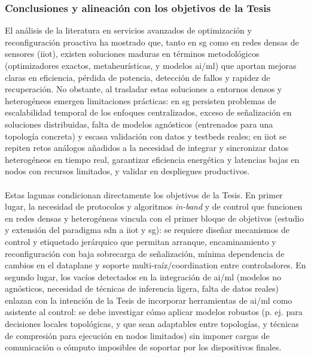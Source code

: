 \subsubsection{Conclusiones y alineación con los objetivos de la Tesis}
\label{subsubsec:conclu_opt}
El análisis de la literatura en servicios avanzados de optimización y reconfiguración proactiva ha mostrado que, tanto en \gls{sg} como en redes densas de sensores (\gls{iiot}), existen soluciones maduras en términos metodológicos (optimizadores exactos, metaheurísticas, y modelos \gls{ai}/\gls{ml}) que aportan mejoras claras en eficiencia, pérdida de potencia, detección de fallos y rapidez de recuperación. No obstante, al trasladar estas soluciones a entornos densos y heterogéneos emergen limitaciones prácticas: en \gls{sg} persisten problemas de escalabilidad temporal de los enfoques centralizados, exceso de señalización en soluciones distribuidas, falta de modelos agnósticos (entrenados para una topología concreta) y escasa validación con datos y testbeds reales; en \gls{iiot} se repiten retos análogos añadidos a la necesidad de integrar y sincronizar datos heterogéneos en tiempo real, garantizar eficiencia energética y latencias bajas en nodos con recursos limitados, y validar en despliegues productivos.\\
\\
Estas lagunas condicionan directamente los objetivos de la Tesis. En primer lugar, la necesidad de protocolos y algoritmos \emph{in-band} y de control que funcionen en redes densas y heterogéneas vincula con el primer bloque de objetivos (estudio y extensión del paradigma \gls{sdn} a \gls{iiot} y \gls{sg}): se requiere diseñar mecanismos de control y etiquetado jerárquico que permitan arranque, encaminamiento y reconfiguración con baja sobrecarga de señalización, mínima dependencia de cambios en el dataplane y soporte multi-raíz/coordination entre controladores. En segundo lugar, los vacíos detectados en la integración de \gls{ai}/\gls{ml} (modelos no agnósticos, necesidad de técnicas de inferencia ligera, falta de datos reales) enlazan con la intención de la Tesis de incorporar herramientas de \gls{ai}/\gls{ml} como asistente al control: se debe investigar cómo aplicar modelos robustos (p. ej. para decisiones locales topológicas, y que sean adaptables entre topologías, y técnicas de compresión para ejecución en nodos limitados) sin imponer cargas de comunicación o cómputo imposibles de soportar por los dispositivos finales.\\
\\
